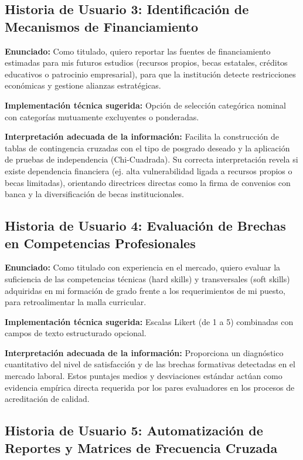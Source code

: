 \documentclass[12pt]{article}
\begin{document}
\subsection*{Historia de Usuario 3: Identificación de Mecanismos de Financiamiento}

\textbf{Enunciado:} Como titulado, quiero reportar las fuentes de
financiamiento estimadas para mis futuros estudios (recursos propios,
becas estatales, créditos educativos o patrocinio empresarial), para que
la institución detecte restricciones económicas y gestione alianzas
estratégicas.

\textbf{Implementación técnica sugerida:} Opción de selección categórica
nominal con categorías mutuamente excluyentes o ponderadas.

\textbf{Interpretación adecuada de la información:} Facilita la
construcción de tablas de contingencia cruzadas con el tipo de posgrado
deseado y la aplicación de pruebas de independencia (Chi-Cuadrada). Su
correcta interpretación revela si existe dependencia financiera (ej. alta
vulnerabilidad ligada a recursos propios o becas limitadas), orientando
directrices directas como la firma de convenios con banca y la
diversificación de becas institucionales.

\subsection*{Historia de Usuario 4: Evaluación de Brechas en Competencias Profesionales}

\textbf{Enunciado:} Como titulado con experiencia en el mercado, quiero
evaluar la suficiencia de las competencias técnicas (hard skills) y
transversales (soft skills) adquiridas en mi formación de grado frente a
los requerimientos de mi puesto, para retroalimentar la malla curricular.

\textbf{Implementación técnica sugerida:} Escalas Likert (de 1 a 5)
combinadas con campos de texto estructurado opcional.

\textbf{Interpretación adecuada de la información:} Proporciona un
diagnóstico cuantitativo del nivel de satisfacción y de las brechas
formativas detectadas en el mercado laboral. Estos puntajes medios y
desviaciones estándar actúan como evidencia empírica directa requerida por
los pares evaluadores en los procesos de acreditación de calidad.

\subsection*{Historia de Usuario 5: Automatización de Reportes y Matrices de Frecuencia Cruzada}
\end{document}
